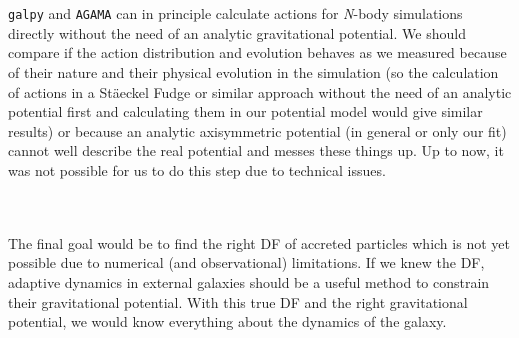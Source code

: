\\\\
\texttt{galpy} and \texttt{AGAMA} \citep{Vasiliev...AGAMA...2019} can in principle calculate actions for \textit{N}-body simulations directly without the need of an analytic gravitational potential. We should compare if the action distribution and evolution behaves as we measured because of their nature and their physical evolution in the simulation (so the calculation of actions in a St\"aeckel Fudge or similar approach without the need of an analytic potential first and calculating them in our potential model would give similar results) or because an analytic axisymmetric potential (in general or only our fit) cannot well describe the real potential and messes these things up. Up to now, it was not possible for us to do this step due to technical issues. 

\\\\The final goal would be to find the right \ac{DF} of accreted particles which is not yet possible due to numerical (and observational) limitations. If we knew the \ac{DF}, adaptive dynamics in external galaxies should be a useful method to constrain their gravitational potential. With this true \ac{DF} and the right gravitational potential, we would know everything about the dynamics of the galaxy.


